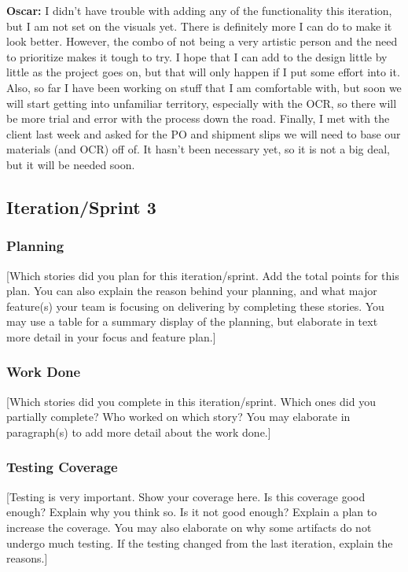 \documentclass{article}
\begin{document}
\textbf{Oscar:} I didn't have trouble with adding any of the functionality this iteration, but I am not set on the visuals yet. There is definitely more I can do to make it look better. However, the combo of not being a very artistic person and the need to prioritize makes it tough to try. I hope that I can add to the design little by little as the project goes on, but that will only happen if I put some effort into it. 
Also, so far I have been working on stuff that I am comfortable with, but soon we will start getting into unfamiliar territory, especially with the OCR, so there will be more trial and error with the process down the road. 
Finally, I met with the client last week and asked for the PO and shipment slips we will need to base our materials (and OCR) off of. It hasn't been necessary yet, so it is not a big deal, but it will be needed soon. 



\subsection{Iteration/Sprint 3}
\subsubsection{Planning}
[Which stories did you plan for this iteration/sprint. Add the total points for this plan. You can also explain the reason behind your planning, and what major feature(s) your team is focusing on delivering by completing these stories. You may use a table for a summary display of the planning, but elaborate in text more detail in your focus and feature plan.]

\subsubsection{Work Done}
[Which stories did you complete in this iteration/sprint. Which ones did you partially complete? Who worked on which story? You may elaborate in paragraph(s) to add more detail about the work done.]

\subsubsection{Testing Coverage}
[Testing is very important. Show your coverage here. Is this coverage good enough? Explain why you think so. Is it not good enough? Explain a plan to increase the coverage. You may also elaborate on why some artifacts do not undergo much testing. If the testing changed from the last iteration, explain the reasons.]
\end{document}
